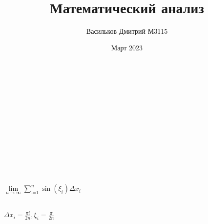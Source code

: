 \documentclass{article}
\title{Математический анализ}
\author{Васильков Дмитрий М3115}
\date{Март 2023}
\begin{document}
\maketitle

\begin{center}
\end{center}

\begin{center}
    \\\\
\end{center}

\begin{center}
    \\\\
\end{center}

\begin{center}
    \\\\
\end{center}

\begin{center}
    \\\\
\end{center}

\begin{center}
\end{center}

\begin{center}
\end{center}

\begin{center}
\end{center}

\begin{left}
$\lim\limits_{n\to \infty} \sum_\text{i=1}^n\sin(\xi_i)\Delta x_i$\\\\
\end{left}

$\Delta x_i = \frac{\pi i}{2n},\xi_i = \frac{\pi}{2n}$\\\\
\end{document}
